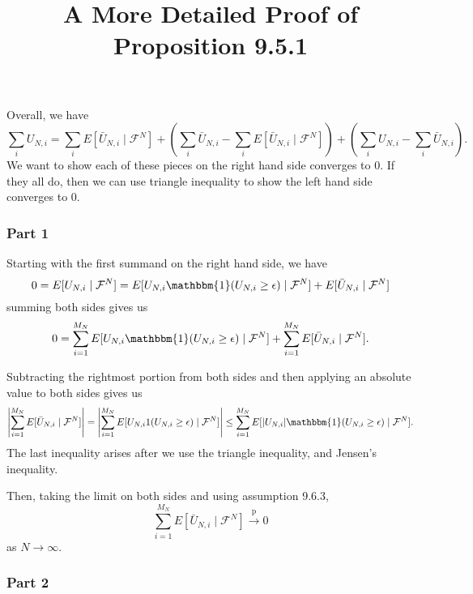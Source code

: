 \documentclass{article}
\title{A More Detailed Proof of Proposition 9.5.1}
\begin{document}
\maketitle

Overall, we have
$$
\sum_i U_{N,i} = \sum_i E[ \bar{U}_{N,i}  \mid \mathcal{F}^N]  + \left(\sum_i \bar{U}_{N,i} - \sum_i E[ \bar{U}_{N,i}  \mid \mathcal{F}^N] \right) +  \left(\sum_i U_{N,i} - \sum_i \bar{U}_{N,i}\right).
$$
We want to show each of these pieces on the right hand side converges to $0$. If they all do, then we can use triangle inequality to show the left hand side converges to $0$.


\subsubsection*{Part 1}

Starting with the first summand on the right hand side, we have
\[
0 = E[U_{N,i} \mid \mathcal{F}^N] = E[U_{N,i}\mathbbm{1}(U_{N,i} \ge \epsilon) \mid \mathcal{F}^N] + E[\bar{U}_{N,i}\mid \mathcal{F}^N ]
\]
summing both sides gives us
\[
0 = \sum_{i=1}^{M_N} E[U_{N,i} \mathbbm{1}(U_{N,i} \ge \epsilon) \mid \mathcal{F}^N] + \sum_{i=1}^{M_N} E[\bar{U}_{N,i}\mid \mathcal{F}^N ].
\]

Subtracting the rightmost portion from both sides and then applying an absolute value to both sides gives us
\[
\left|\sum_{i=1}^{M_N} E[\bar{U}_{N,i}\mid \mathcal{F}^N ] \right| = \left| \sum_{i=1}^{M_N} E[U_{N,i}1(U_{N,i} \ge \epsilon) \mid \mathcal{F}^N] \right| \le \sum_{i=1}^{M_N} E[|U_{N,i}| \mathbbm{1}(U_{N,i} \ge \epsilon) \mid \mathcal{F}^N] .
\]
The last inequality arises after we use the triangle inequality, and Jensen's inequality. 

Then, taking the limit on both sides and using assumption 9.6.3,
\[
\sum_{i=1}^{M_N} E[\bar{U}_{N,i}\mid \mathcal{F}^N ] \overset{\text{p}}{\to} 0 \tag{1} 
\]
as $N \to \infty$.

\subsubsection*{Part 2}
\end{document}

